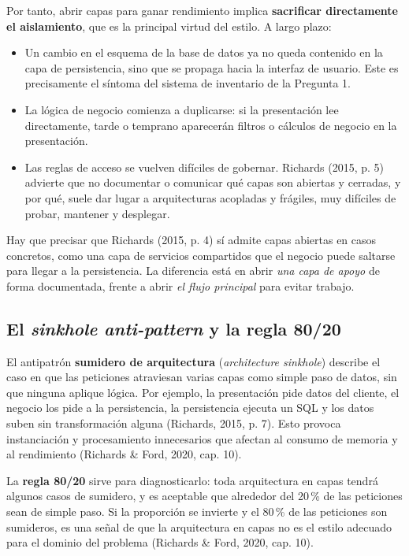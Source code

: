 \documentclass[11pt,a4paper]{article}
\begin{document}
Por tanto, abrir capas para ganar rendimiento implica \textbf{sacrificar directamente el aislamiento}, que es la principal virtud del estilo. A largo plazo:

\begin{itemize}[leftmargin=1.5em]
  \item Un cambio en el esquema de la base de datos ya no queda contenido en la capa de persistencia, sino que se propaga hacia la interfaz de usuario. Este es precisamente el síntoma del sistema de inventario de la Pregunta 1.
  \item La lógica de negocio comienza a duplicarse: si la presentación lee directamente, tarde o temprano aparecerán filtros o cálculos de negocio en la presentación.
  \item Las reglas de acceso se vuelven difíciles de gobernar. Richards (2015, p. 5) advierte que no documentar o comunicar qué capas son abiertas y cerradas, y por qué, suele dar lugar a arquitecturas acopladas y frágiles, muy difíciles de probar, mantener y desplegar.
\end{itemize}

Hay que precisar que Richards (2015, p. 4) sí admite capas abiertas en casos concretos, como una capa de servicios compartidos que el negocio puede saltarse para llegar a la persistencia. La diferencia está en abrir \emph{una capa de apoyo} de forma documentada, frente a abrir \emph{el flujo principal} para evitar trabajo.

\subsection{El \emph{sinkhole anti-pattern} y la regla 80/20}

El antipatrón \textbf{sumidero de arquitectura} (\emph{architecture sinkhole}) describe el caso en que las peticiones atraviesan varias capas como simple paso de datos, sin que ninguna aplique lógica. Por ejemplo, la presentación pide datos del cliente, el negocio los pide a la persistencia, la persistencia ejecuta un SQL y los datos suben sin transformación alguna (Richards, 2015, p. 7). Esto provoca instanciación y procesamiento innecesarios que afectan al consumo de memoria y al rendimiento (Richards \& Ford, 2020, cap. 10).

La \textbf{regla 80/20} sirve para diagnosticarlo: toda arquitectura en capas tendrá algunos casos de sumidero, y es aceptable que alrededor del 20\,\% de las peticiones sean de simple paso. Si la proporción se invierte y el 80\,\% de las peticiones son sumideros, es una señal de que la arquitectura en capas no es el estilo adecuado para el dominio del problema (Richards \& Ford, 2020, cap. 10).
\end{document}
